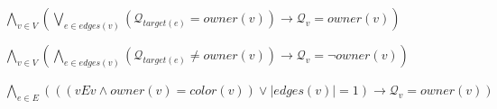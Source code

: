 \begin{algorithm}[H]
    \caption{DFS Get Play Parity}
    \begin{algorithmic}[1]
        
        \State $\bigwedge_{v \in V}(\bigvee_{e \in edges(v)}(\mathcal{Q}_{\textit{target}(e)} = \textit{owner}(v)) \rightarrow \mathcal{Q}_v=\textit{owner}(v))$

        \State $\bigwedge_{v \in V}(\bigwedge_{e \in edges(v)}(\mathcal{Q}_{\textit{target}(e)} \neq \textit{owner}(v)) \rightarrow \mathcal{Q}_v = \neg \textit{owner}(v))$


        \State $\bigwedge_{e \in E}(
        ((vEv \wedge owner(v)=color(v)) \vee |edges(v)|=1)  \rightarrow \mathcal{Q}_v = owner(v))$

    \end{algorithmic}
    \label{alg:cp-hra}
\end{algorithm}